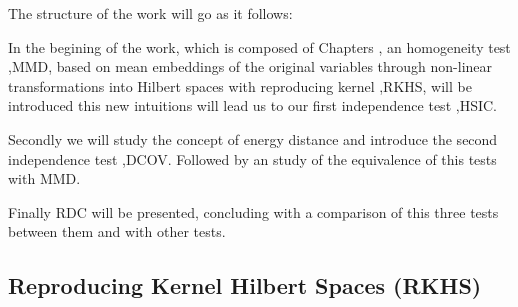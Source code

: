 The structure of the work will go as it follows:

In the begining of the work, which is composed of Chapters , an homogeneity test ,MMD, based on mean embeddings of the original variables through non-linear transformations into Hilbert spaces with reproducing kernel ,RKHS, will be introduced this new intuitions will lead us to our first independence test ,HSIC.

Secondly we will study the concept of energy distance and introduce the second independence test ,DCOV. Followed by an study of the equivalence of this tests with MMD.

Finally RDC will be presented, concluding with a comparison of this three tests between them and with other tests. 

\subsection{Reproducing Kernel Hilbert Spaces (RKHS)}



